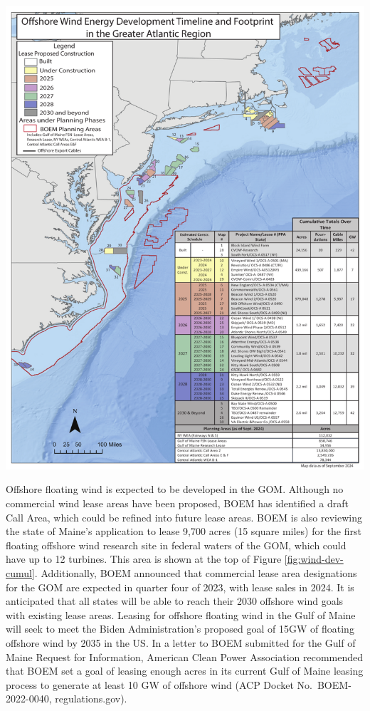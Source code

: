 \documentclass[
  10pt,
]{article}
\let\origfigure\figure
\let\endorigfigure\endfigure
\renewenvironment{figure}[1][2] {
    \expandafter\origfigure\expandafter[H]
} {
    \endorigfigure
}
\begin{document}
\begin{figure}

{\centering \includegraphics[width=0.9\linewidth]{SOE-NEFMC_files/figure-latex/wind-dev-cumul2-1} 

}

\caption{All Northeast Project areas by year construction ends (each project has 2 year construction period).}\label{fig:wind-dev-cumul2}
\end{figure}

Offshore floating wind is expected to be developed in the GOM. Although no commercial wind lease areas have been proposed, BOEM has identified a draft Call Area, which could be refined into future lease areas. BOEM is also reviewing the state of Maine's application to lease 9,700 acres (15 square miles) for the first floating offshore wind research site in federal waters of the GOM, which could have up to 12 turbines. This area is shown at the top of Figure \ref{fig:wind-dev-cumul}. Additionally, BOEM announced that commercial lease area designations for the GOM are expected in quarter four of 2023, with lease sales in 2024. It is anticipated that all states will be able to reach their 2030 offshore wind goals with existing lease areas. Leasing for offshore floating wind in the Gulf of Maine will seek to meet the Biden Administration's proposed goal of 15GW of floating offshore wind by 2035 in the US. In a letter to BOEM submitted for the Gulf of Maine Request for Information, American Clean Power Association recommended that BOEM set a goal of leasing enough acres in its current Gulf of Maine leasing process to generate at least 10 GW of offshore wind (ACP Docket No.~BOEM-2022-0040, regulations.gov).
\end{document}
